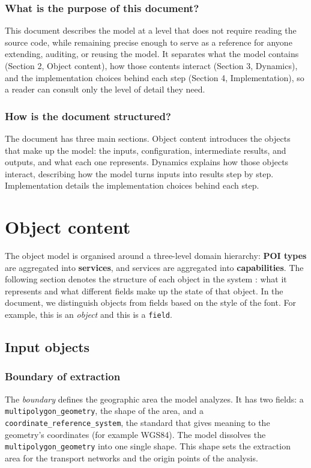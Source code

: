 \documentclass{article}
\begin{document}
\subsubsection*{What is the purpose of this document?}
This document describes the model at a level that does not require reading the source code, while remaining precise enough to serve as a reference for anyone extending, auditing, or reusing the model. It separates what the model contains (Section 2, Object content), how those contents interact (Section 3, Dynamics), and the implementation choices behind each step (Section 4, Implementation), so a reader can consult only the level of detail they need.

\subsubsection*{How is the document structured?}
The document has three main sections. Object content introduces the objects that make up the model: the inputs, configuration, intermediate results, and outputs, and what each one represents. Dynamics explains how those objects interact, describing how the model turns inputs into results step by step. Implementation details the implementation choices behind each step.

\section{Object content}
The object model is organised around a three-level domain hierarchy: \textbf{POI types} are aggregated into \textbf{services}, and services are aggregated into \textbf{capabilities}. The following section denotes the structure of each object in the system : what it represents and what different fields make up the state of that object. In the document, we distinguish objects from fields based on the style of the font. For example, this is an \emph{object} and this is a \texttt{field}.
\subsection{Input objects}
\subsubsection*{Boundary of extraction}
    The \emph{boundary} defines the geographic area the model analyzes. It has two fields: a \texttt{multipolygon\_\allowbreak geometry}, the shape of the area, and a \texttt{coordinate\_\allowbreak reference\_\allowbreak system}, the standard that gives meaning to the geometry's coordinates (for example WGS84). The model dissolves the \texttt{multipolygon\_\allowbreak geometry} into one single shape. This shape sets the extraction area for the transport networks and the origin points of the analysis.
\end{document}
